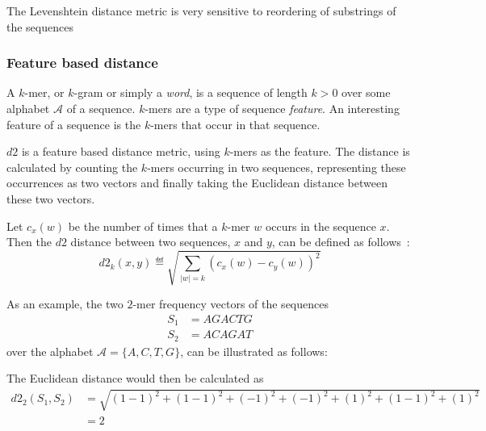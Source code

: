 The Levenshtein distance metric is very sensitive to reordering of substrings
of the sequences %


\subsubsection{Feature based distance}

A $k$-mer, or $k$-gram or simply a \emph{word}, is a sequence of length
$k > 0$ over some alphabet $\mathcal{A}$ of a sequence. $k$-mers are a type
of sequence \emph{feature}. An interesting feature of a sequence is the
$k$-mers that occur in that sequence.

$d2$ is a feature based distance metric, using $k$-mers as the feature. The
distance is calculated by counting the $k$-mers occurring in two sequences,
representing these occurrences as two vectors and finally taking the Euclidean
distance between these two vectors.~\cite[pp.~53-54]{dong}

Let $c_x(w)$ be the number of times that a $k$-mer $w$ occurs in the sequence
$x$. Then the $d2$ distance between two sequences, $x$ and $y$, can be defined
as follows~\cite[pp.~1-2]{hazelhurst}:
\begin{equation}
  d2_k(x,y) \eqdef \sqrt{\sum_{|w|=k} (c_x(w) - c_y(w))^2}
\end{equation}

As an example, the two $2$-mer frequency vectors of the sequences
\begin{align*}
  S_1 &= AGACTG \\
  S_2 &= ACAGAT
\end{align*}
over the alphabet $\mathcal{A} = \{A,C,T,G\}$, can be illustrated as follows:

\begin{table}[!h]
\centering
{}
\end{table}

The Euclidean distance would then be calculated as
\begin{align*}
  d2_2(S_1, S_2)
    &= \sqrt{(1-1)^2 + (1-1)^2 + (-1)^2 + (-1)^2 + (1)^2 + (1-1)^2 + (1)^2} \\
    &= 2
\end{align*}

